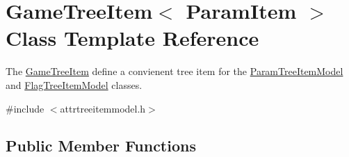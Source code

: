 \hypertarget{class_game_tree_item}{\section{\-Game\-Tree\-Item$<$ \-Param\-Item $>$ \-Class \-Template \-Reference}
\label{class_game_tree_item}
}


\-The \hyperlink{class_game_tree_item}{\-Game\-Tree\-Item} define a convienent tree item for the \hyperlink{class_param_tree_item_model}{\-Param\-Tree\-Item\-Model} and \hyperlink{class_flag_tree_item_model}{\-Flag\-Tree\-Item\-Model} classes.  




{\ttfamily \#include $<$attrtreeitemmodel.\-h$>$}

\subsection*{\-Public \-Member \-Functions}
